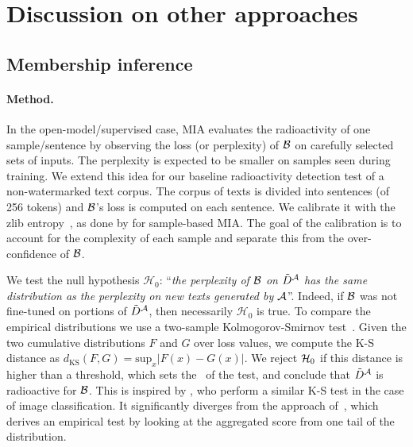 

\section{Discussion on other approaches}\label{chap6/sec:discussion-other-approaches}



\subsection{Membership inference}\label{chap6/par:mia_wm}

\paragraph*{Method.}
In the open-model/supervised case, MIA evaluates the radioactivity of one sample/sentence by observing the loss (or perplexity) of $\mathcal B$ on carefully selected sets of inputs.
The perplexity is expected to be smaller on samples seen during training.
We extend this idea for our baseline radioactivity detection test of a non-watermarked text corpus.
The corpus of texts is divided into sentences (of 256 tokens) and $\mathcal B$'s loss is computed on each sentence. 
We calibrate it with the zlib entropy~\citep{roelofs2017zlib}, as done by \citet{carlini2021extracting} for sample-based MIA. 
The goal of the calibration is to account for the complexity of each sample and separate this from the over-confidence of $\mathcal B$. 

We test the null hypothesis $\mathcal{H}_0$: ``\textit{the perplexity of $\mathcal B$ on $\Tilde{D}^{\mathcal A}$ has the same distribution as the perplexity on new texts generated by $\mathcal A$}''.
Indeed, if $\mathcal B$ was not fine-tuned on portions of $\Tilde{D}^\mathcal A$, then necessarily $\mathcal{H}_0$ is true.
To compare the empirical distributions we use a two-sample Kolmogorov-Smirnov test~\citep{massey1951kolmogorov}. 
Given the two cumulative distributions $F$ and $G$ over loss values, we compute the K-S distance as $d_{\mathrm{KS}}(F,G) = \mathrm{sup}_x |F(x) -G(x)|$.
We reject $\mathcal{H}_0$ if this distance is higher than a threshold, which sets the \pval\ of the test, and conclude that $\Tilde{D}^{\mathcal A}$ is radioactive for $\mathcal B$.
This is inspired by \citet{sablayrolles2018d}, who perform a similar K-S test in the case of image classification. 
It significantly diverges from the approach of~\citet{shi2023detecting}, which derives an empirical test by looking at the aggregated score from one tail of the distribution. 

